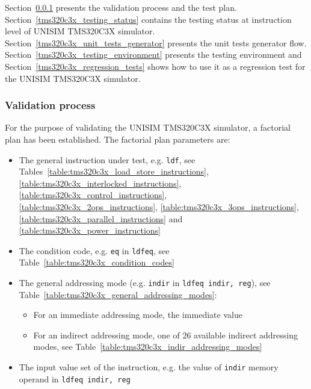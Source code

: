 Section~\ref{tms320c3x_validation_process} presents the validation process and the test plan.
Section~\ref{tms320c3x_testing_status} contains the testing status at instruction level of UNISIM TMS320C3X simulator.
Section~\ref{tms320c3x_unit_tests_generator} presents the unit tests generator flow.
Section~\ref{tms320c3x_testing_environment} presents the testing environment and Section~\ref{tms320c3x_regression_tests} shows how to use it as a regression test for the UNISIM TMS320C3X simulator.

\subsubsection{Validation process}
\label{tms320c3x_validation_process}

For the purpose of validating the UNISIM TMS320C3X simulator, a factorial plan has been established. The factorial plan parameters are:
\begin{itemize}
\item The general instruction under test, e.g. \texttt{ldf}, see Tables~\ref{table:tms320c3x_load_store_instructions}, \ref{table:tms320c3x_interlocked_instructions},  \ref{table:tms320c3x_control_instructions}, \ref{table:tms320c3x_2ops_instructions}, \ref{table:tms320c3x_3ops_instructions}, \ref{table:tms320c3x_parallel_instructions} and \ref{table:tms320c3x_power_instructions}
\item The condition code, e.g. \texttt{eq} in \texttt{ldfeq}, see Table~\ref{table:tms320c3x_condition_codes}
\item The general addressing mode (e.g. \texttt{indir} in \texttt{ldfeq indir, reg}), see Table~\ref{table:tms320c3x_general_addressing_modes}:
	\begin{itemize}
		\item For an immediate addressing mode, the immediate value
		\item For an indirect addressing mode, one of 26 available indirect addressing modes, see Table~\ref{table:tms320c3x_indir_addressing_modes}
	\end{itemize}
\item The input value set of the instruction, e.g. the value of \texttt{indir} memory operand in \texttt{ldfeq indir, reg}
\end{itemize}


